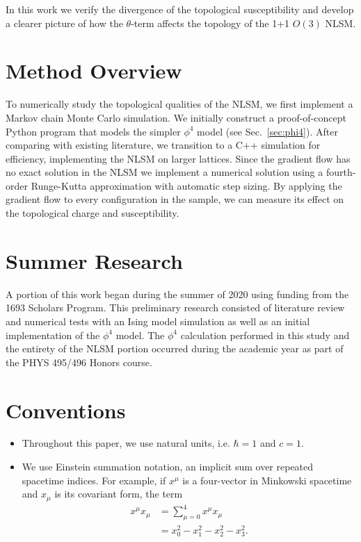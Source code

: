 In this work we verify the divergence of the topological susceptibility and develop a clearer picture of how the $\theta$-term affects the topology of the 1+1 $O(3)$ NLSM.


\section{Method Overview}

To numerically study the topological qualities of the NLSM, we first implement a Markov chain Monte Carlo simulation. We initially construct a proof-of-concept Python program that models the simpler $\phi^4$ model (see Sec.~\ref{sec:phi4}). After comparing with existing literature, we transition to a C++ simulation for efficiency, implementing the NLSM on larger lattices. Since the gradient flow has no exact solution in the NLSM we implement a numerical solution using a fourth-order Runge-Kutta approximation with automatic step sizing. By applying the gradient flow to every configuration in the sample, we can measure its effect on the topological charge and susceptibility.

\section{Summer Research}

A portion of this work began during the summer of 2020 using funding from the 1693 Scholars Program. This preliminary research consisted of literature review and numerical tests with an Ising model simulation as well as an initial implementation of the $\phi^4$ model. The $\phi^4$ calculation performed in this study and the entirety of the NLSM portion occurred during the academic year as part of the PHYS 495/496 Honors course.


\section{Conventions}
\begin{itemize}
    \item Throughout this paper, we use natural units, i.e. $\hbar = 1$ and $c=1$.
    \item We use Einstein summation notation, an implicit sum over repeated spacetime indices. For example, if $x^\mu$ is a four-vector in Minkowski spacetime and $x_\mu$ is its covariant form, the term
        \begin{align*}
            x^\mu x_\mu &= \sum^4_{\mu=0} x^\mu x_\mu \\
            &= x_0^2-x_1^2-x_2^2-x_3^2.
        \end{align*}

\end{itemize}

